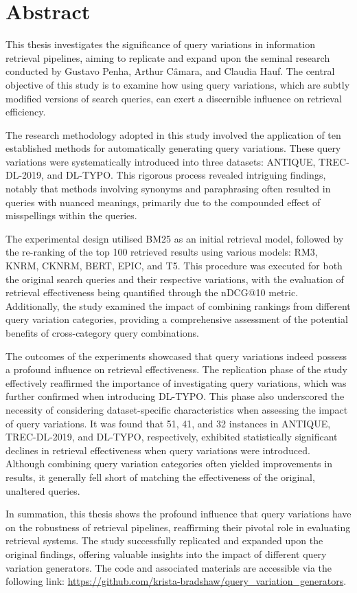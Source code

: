 \chapter{Abstract}
This thesis investigates the significance of query variations in information retrieval pipelines, aiming to replicate and expand upon the seminal research conducted by Gustavo Penha, Arthur Câmara, and Claudia Hauf. The central objective of this study is to examine how using query variations, which are subtly modified versions of search queries, can exert a discernible influence on retrieval efficiency.

The research methodology adopted in this study involved the application of ten established methods for automatically generating query variations. These query variations were systematically introduced into three datasets: ANTIQUE, TREC-DL-2019, and DL-TYPO. This rigorous process revealed intriguing findings, notably that methods involving synonyms and paraphrasing often resulted in queries with nuanced meanings, primarily due to the compounded effect of misspellings within the queries.

The experimental design utilised BM25 as an initial retrieval model, followed by the re-ranking of the top 100 retrieved results using various models: RM3, KNRM, CKNRM, BERT, EPIC, and T5. This procedure was executed for both the original search queries and their respective variations, with the evaluation of retrieval effectiveness being quantified through the nDCG@10 metric. Additionally, the study examined the impact of combining rankings from different query variation categories, providing a comprehensive assessment of the potential benefits of cross-category query combinations.

The outcomes of the experiments showcased that query variations indeed possess a profound influence on retrieval effectiveness. The replication phase of the study effectively reaffirmed the importance of investigating query variations, which was further confirmed when introducing DL-TYPO. This phase also underscored the necessity of considering dataset-specific characteristics when assessing the impact of query variations. It was found that 51, 41, and 32 instances in ANTIQUE, TREC-DL-2019, and DL-TYPO, respectively, exhibited statistically significant declines in retrieval effectiveness when query variations were introduced. Although combining query variation categories often yielded improvements in results, it generally fell short of matching the effectiveness of the original, unaltered queries.

In summation, this thesis shows the profound influence that query variations have on the robustness of retrieval pipelines, reaffirming their pivotal role in evaluating retrieval systems. The study successfully replicated and expanded upon the original findings, offering valuable insights into the impact of different query variation generators. The code and associated materials are accessible via the following link: \url{https://github.com/krista-bradshaw/query_variation_generators}.